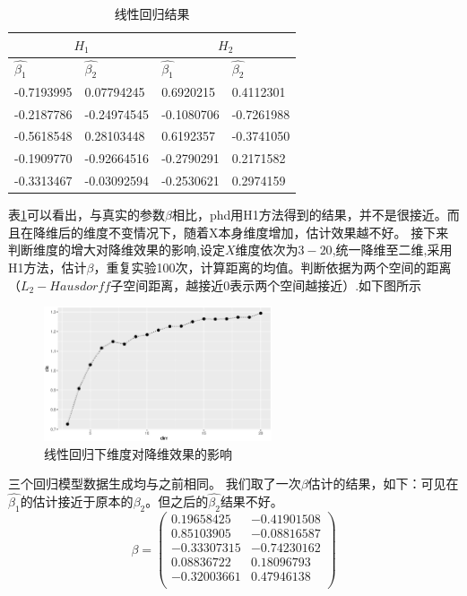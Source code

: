 \begin{table}[htbp]
\centering
\caption{线性回归结果}
\label{tab:norm}
\begin{tabular}{l|l|ll}
\hline
\multicolumn{2}{c|}{$H_1$} & \multicolumn{2}{c}{$H_2$}                    \\ \hline
$\hat{\beta_{1}}$&$\hat{\beta_{2}}$& \multicolumn{1}{l|}{$\hat{\beta_{1}}$}  &$\hat{\beta_{2}}$ \\ \hline
-0.7193995  & 0.07794245   & \multicolumn{1}{l|}{0.6920215}  & 0.4112301  \\ \hline
-0.2187786  & -0.24974545  & \multicolumn{1}{l|}{-0.1080706} & -0.7261988 \\ \hline
-0.5618548  & 0.28103448   & \multicolumn{1}{l|}{0.6192357}  & -0.3741050 \\ \hline
-0.1909770  & -0.92664516  & \multicolumn{1}{l|}{-0.2790291} & 0.2171582  \\ \hline
-0.3313467  & -0.03092594  & \multicolumn{1}{l|}{-0.2530621} & 0.2974159  \\ \hline
\end{tabular}
\end{table}
表\ref{tab:norm}可以看出，与真实的参数$\beta$相比，phd用H1方法得到的结果，并不是很接近。而且在降维后的维度不变情况下，随着X本身维度增加，估计效果越不好。
接下来判断维度的增大对降维效果的影响,设定$X$维度依次为$3-20$,统一降维至二维,采用H1方法，估计$\beta$，重复实验100次，计算距离的均值。判断依据为两个空间的距离（$L_2-Hausdorff$子空间距离，越接近0表示两个空间越接近）.如下图所示
\begin{figure}[H]
    \centering
    \includegraphics[width=0.6\textwidth]{image/norm_phd.eps} 
    \caption{线性回归下维度对降维效果的影响}
\end{figure}
三个回归模型数据生成均与之前相同。
我们取了一次$\beta$估计的结果，如下：可见在$\hat{\beta_1}$的估计接近于原本的$\beta_2$。但之后的$\hat{\beta_2}$结果不好。
\begin{equation}       %
    \beta= \left(                 %
       \begin{array}{cc}   %
        0.19658425 & -0.41901508\\  %
        0.85103905  & -0.08816587 \\  %
        -0.33307315  &-0.74230162 \\
        0.08836722& 0.18096793 \\
        -0.32003661 & 0.47946138 \\
       \end{array}
     \right)                 %
 \end{equation}
